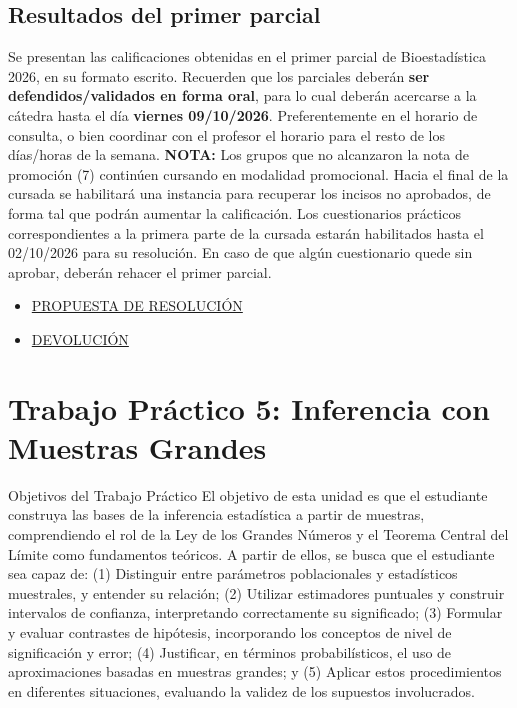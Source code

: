 \documentclass[
  spanish,
  letterpaper,
  DIV=11,
  numbers=noendperiod]{scrreprt}
\providecommand{\tightlist}{%
  \setlength{\itemsep}{0pt}\setlength{\parskip}{0pt}}
\begin{document}
\section*{Resultados del primer
parcial}\label{resultados-del-primer-parcial}


Se presentan las calificaciones obtenidas en el primer parcial de
Bioestadística 2026, en su formato escrito. Recuerden que los parciales
deberán \textbf{ser defendidos/validados en forma oral}, para lo cual
deberán acercarse a la cátedra hasta el día \textbf{viernes 09/10/2026}.
Preferentemente en el horario de consulta, o bien coordinar con el
profesor el horario para el resto de los días/horas de la semana.
\textbf{NOTA:} Los grupos que no alcanzaron la nota de promoción (7)
continúen cursando en modalidad promocional. Hacia el final de la
cursada se habilitará una instancia para recuperar los incisos no
aprobados, de forma tal que podrán aumentar la calificación. Los
cuestionarios prácticos correspondientes a la primera parte de la
cursada estarán habilitados hasta el 02/10/2026 para su resolución. En
caso de que algún cuestionario quede sin aprobar, deberán rehacer el
primer parcial.

\begin{itemize}
\tightlist
\item
  \href{./PRIMER\%20PARCIAL/RESOLUCIÓN\%20PARCIAL\%201.R}{PROPUESTA DE
  RESOLUCIÓN}
\item
  \href{./PRIMER\%20PARCIAL/anotaciones\%20primer\%20parcial\%202026.txt}{DEVOLUCIÓN}
\end{itemize}


\chapter{Trabajo Práctico 5: Inferencia con Muestras
Grandes}\label{trabajo-pruxe1ctico-5-inferencia-con-muestras-grandes}

Objetivos del Trabajo Práctico El objetivo de esta unidad es que el
estudiante construya las bases de la inferencia estadística a partir de
muestras, comprendiendo el rol de la Ley de los Grandes Números y el
Teorema Central del Límite como fundamentos teóricos. A partir de ellos,
se busca que el estudiante sea capaz de: (1) Distinguir entre parámetros
poblacionales y estadísticos muestrales, y entender su relación; (2)
Utilizar estimadores puntuales y construir intervalos de confianza,
interpretando correctamente su significado; (3) Formular y evaluar
contrastes de hipótesis, incorporando los conceptos de nivel de
significación y error; (4) Justificar, en términos probabilísticos, el
uso de aproximaciones basadas en muestras grandes; y (5) Aplicar estos
procedimientos en diferentes situaciones, evaluando la validez de los
supuestos involucrados.
\end{document}
